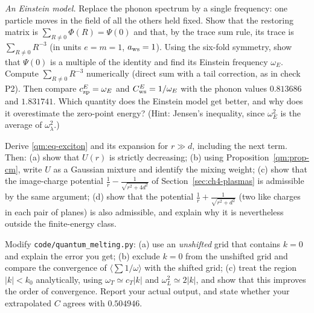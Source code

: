 \begin{exercise}\label{qm:ex-einstein}
\emph{An Einstein model.} Replace the phonon spectrum by a single frequency: one particle moves in the field of all
the others held fixed. Show that the restoring matrix is $\sum_{R\ne0}\Phi(R)=\Psi(0)$ and that, by the trace sum
rule, its trace is $\sum_{R\ne0}R^{-3}$ (in units $e=m=1$, $a_{\rm ws}=1$). Using the six-fold symmetry, show that
$\Psi(0)$ is a multiple of the identity and find its Einstein frequency $\omega_E$. Compute
$\sum_{R\ne0}R^{-3}$ numerically (direct sum with a tail correction, as in check P2). Then compare
$c_{\rm zp}^{E}=\omega_E$ and $C^E_{\rm ws}=1/\omega_E$ with the phonon values $0.813686$ and $1.831741$. Which
quantity does the Einstein model get better, and why does it overestimate the zero-point energy? (Hint: Jensen's
inequality, since $\omega_E^2$ is the average of $\omega_\lambda^2$.)
\end{exercise}

\begin{exercise}\label{qm:ex-dipole}
Derive \eqref{qm:eq-exciton} and its expansion for $r\gg d$, including the next term. Then: (a) show that $U(r)$ is
strictly decreasing; (b) using Proposition~\ref{qm:prop-cm}, write $U$ as a Gaussian mixture and identify the mixing
weight; (c) show that the image-charge potential $\frac1r-\frac1{\sqrt{r^2+4d^2}}$ of Section~\ref{sec:ch4-plasmas} is
admissible by the same argument; (d) show that the potential $\frac1r+\frac1{\sqrt{r^2+d^2}}$ (two like charges in
each pair of planes) is also admissible, and explain why it is nevertheless outside the finite-energy class.
\end{exercise}

\begin{exercise}\label{qm:ex-convergence}
Modify \texttt{code/quantum\_melting.py}: (a) use an \emph{unshifted} grid that contains $k=0$ and explain the error
you get; (b) exclude $k=0$ from the unshifted grid and compare the convergence of $\langle\sum1/\omega\rangle$ with the
shifted grid; (c) treat the region $|k|<k_0$ analytically, using $\omega_T\simeq c_T|k|$ and $\omega_L^2\simeq2|k|$, and
show that this improves the order of convergence. Report your actual output, and state whether your extrapolated $C$
agrees with $0.504946$.
\end{exercise}
